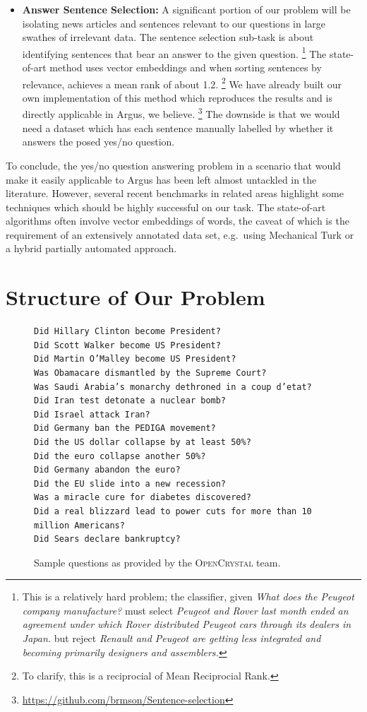 \documentclass[11pt,a4paper]{article}
\begin{document}
\begin{itemize}
	\item \textbf{Answer Sentence Selection:} A significant portion
		of our problem will be isolating news articles
		and sentences relevant to our questions in large swathes
		of irrelevant data.  The sentence selection sub-task is
		about identifying sentences that bear an answer to the
		given question.%
\footnote{This is a relatively hard problem; the
		classifier, given \textit{What does the Peugeot company manufacture?}
		must select \textit{Peugeot and Rover last month ended an agreement under which Rover distributed Peugeot cars through its dealers in Japan.}
	but reject \textit{Renault and Peugeot are getting less integrated and becoming primarily designers and assemblers.}}
		The state-of-art method \citep{Yu2014Deep} uses vector embeddings
		and when sorting sentences by relevance, achieves a mean rank
		of about 1.2.%
\footnote{To clarify, this is a reciprocial of Mean Reciprocial Rank.}
		We have already built our own implementation of this method
		which reproduces the results and is directly applicable
		in Argus, we believe.%
\footnote{\url{https://github.com/brmson/Sentence-selection}}
		The downside is that we would need a dataset which has
		each sentence manually labelled by whether it answers
		the posed yes/no question.

\end{itemize}

To conclude, the yes/no question answering problem in a scenario that
would make it easily applicable to Argus has been left almost untackled
in the literature.  However, several recent benchmarks in related areas
highlight some techniques which should be highly successful on our task.
The state-of-art algorithms often involve vector embeddings of words,
the caveat of which is the requirement of an extensively annotated
data set, e.g.\ using Mechanical Turk or a hybrid partially automated
approach.

\section{Structure of Our Problem}
\label{structure}

\begin{figure}
\begin{verbatim}
Did Hillary Clinton become President?
Did Scott Walker become US President?
Did Martin O’Malley become US President?
Was Obamacare dismantled by the Supreme Court?
Was Saudi Arabia’s monarchy dethroned in a coup d’etat?
Did Iran test detonate a nuclear bomb?
Did Israel attack Iran?
Did Germany ban the PEDIGA movement?
Did the US dollar collapse by at least 50%?
Did the euro collapse another 50%?
Did Germany abandon the euro?
Did the EU slide into a new recession?
Was a miracle cure for diabetes discovered?
Did a real blizzard lead to power cuts for more than 10 million Americans?
Did Sears declare bankruptcy?
\end{verbatim}
	\caption{Sample questions as provided by the \textsc{OpenCrystal} team.}
	\label{fig:sampleq}
\end{figure}
\end{document}
